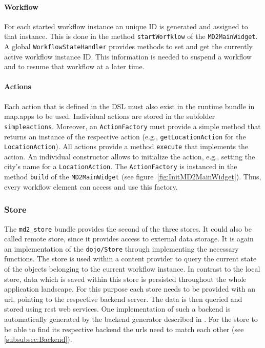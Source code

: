 \paragraph{Workflow}
For each started workflow instance an unique ID is generated and assigned to that instance. This is done in the method \lstinline!startWorfklow! of the \lstinline!MD2MainWidget!. A global \lstinline!WorkflowStateHandler! provides methods to set and get the currently active workflow instance ID. This information is needed to suspend a workflow and to resume that workflow at a later time.

\paragraph{Actions}
Each action that is defined in the \MD DSL must also exist in the \MD runtime bundle in map.apps to be used. Individual actions are stored in the subfolder \lstinline!simpleactions!. Moreover, an \lstinline!ActionFactory! must provide a simple method that returns an instance of the respective action (e.g., \lstinline!getLocationAction! for the \lstinline!LocationAction!). All actions provide a method \lstinline!execute! that implements the action. An individual constructor allows to initialize the action, e.g., setting the city's name for a \lstinline!LocationAction!. The \lstinline!ActionFactory! is instanced in the method \lstinline!build! of the \lstinline!MD2MainWidget! (see figure~\ref{fig:InitMD2MainWidget}). Thus, every workflow element can access and use this factory.

\subsubsection{Store}\label{store}

The \lstinline|md2_store| bundle provides the second of the three stores. It could also be called remote store, since it provides access to external data storage. It is again an implementation of the \lstinline|dojo/Store| through implementing the necessary functions. The store is used within a content provider to query the current state of the objects belonging to the current workflow instance. In contrast to the local store, data which is saved within this store is persisted throughout the whole application landscape. For this purpose each store needs to be provided with an url, pointing to the respective backend server. The data is then queried and stored using rest web services. One implementation of such a backend is automatically generated by the backend generator described in . For the store to be able to find its respective backend the urls need to match each other (see \cref{subsubsec:Backend}). 


